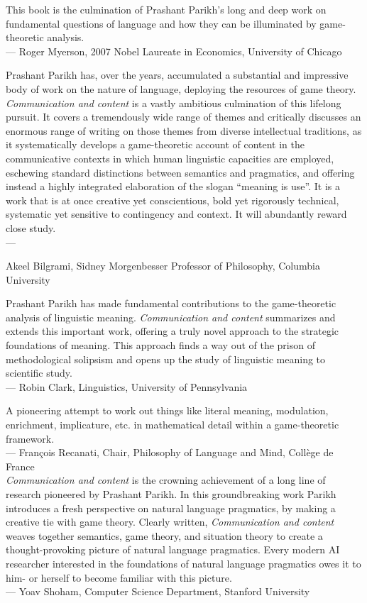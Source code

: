 
\noindent This book is the culmination of Prashant Parikh's long and deep work on fundamental questions of language and how they can be illuminated by game-theoretic analysis.\medskip\\
— Roger Myerson, 2007 Nobel Laureate in Economics, University of Chicago\vfill

\noindent Prashant Parikh has, over the years, accumulated a substantial and impressive body of work on the nature of language, deploying the resources of game theory. \textit{Communication and content} is a vastly ambitious culmination of this lifelong pursuit. It covers a tremendously wide range of themes and critically discusses an enormous range of writing on those themes from diverse intellectual traditions, as it systematically develops a game-theoretic account of content in the communicative contexts in which human linguistic capacities are employed, eschewing standard distinctions between semantics and pragmatics, and offering instead a highly integrated elaboration of the slogan ``meaning is use''. It is a work that is at once creative yet conscientious, bold yet rigorously technical, systematic yet sensitive to contingency and context.  It will abundantly reward close study.\medskip\\
— \parbox[t]{\textwidth-10.8624pt}{Akeel Bilgrami, Sidney Morgenbesser Professor of Philosophy, Columbia University}\vfill

\noindent Prashant Parikh has made fundamental contributions to the game-theoretic analysis of linguistic meaning. \textit{Communication and content} summarizes and extends this important work, offering a truly novel approach to the strategic foundations of meaning. This approach finds a way out of the prison of methodological solipsism and opens up the study of linguistic meaning to scientific study.\medskip\\
— Robin Clark, Linguistics, University of Pennsylvania\vfill\pagebreak

\noindent A pioneering attempt to work out things like literal meaning, modulation, enrichment, implicature, etc. in mathematical detail within a game-theoretic framework.\medskip\\
— François Recanati, Chair, Philosophy of Language and Mind, Collège de France\bigskip\\

\noindent\textit{Communication and content} is the crowning achievement of a long line of research pioneered by Prashant Parikh. In this groundbreaking work Parikh introduces a fresh perspective on natural language pragmatics, by making a creative tie with game theory. Clearly written, \textit{Communication and content} weaves together semantics, game theory, and situation theory to create a thought-pro\-vok\-ing picture of natural language pragmatics. Every modern AI researcher interested in the foundations of natural language pragmatics owes it to him- or herself to become familiar with this picture.\medskip\\
— Yoav Shoham, Computer Science Department, Stanford University\bigskip\\
